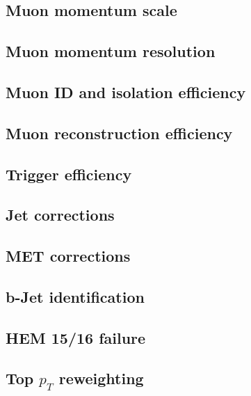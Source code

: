 \subsection{Muon momentum scale} \label{sec:MES}

\subsection{Muon momentum resolution} \label{sec:MER}

\subsection{Muon ID and isolation efficiency} \label{sec:MuonIDIsoEff}

\subsection{Muon reconstruction efficiency} \label{sec:MuonRecoEff}

\subsection{Trigger efficiency} \label{sec:MuonHLTEff}

\subsection{Jet corrections} \label{sec:JEC}

\subsection{MET corrections} \label{sec:METCorr}

\subsection{b-Jet identification} \label{sec:BJetID}

\subsection{HEM 15/16 failure} \label{sec:HEM1516Failure}

\subsection{Top \texorpdfstring{$p_T$}{pT} reweighting} \label{sec:TopPtReweighting}

